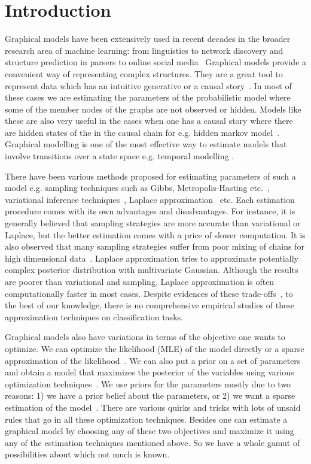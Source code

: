 \section{Introduction}

Graphical models have been extensively used in recent decades in the broader
research area of machine learning: from linguistics to network discovery and
structure prediction in parsers to online social
media~\cite{Koller+Friedman:09} Graphical models provide a convenient way of
representing complex structures.  They are a great tool to represent data
which has an intuitive generative or a causal story~\cite{GettingStarted}. In
most of these cases we are estimating the parameters of the probabilistic
model where some of the member nodes of the graphs are not observed or hidden.
Models like these are also very useful in the cases when one has a causal
story where there are hidden states of the in the causal chain for e.g. hidden
markov model~\cite{Baum1967}. Graphical modelling is one of the most effective
way to estimate models that involve transitions over a state space e.g.
temporal modelling \cite{Arnold:2007:TCM:1281192.1281203}. 

There have been various methods proposed for estimating parameters of such a
model e.g. sampling techniques such as Gibbs, Metropolis-Hasting
etc.~\cite{Robert:2005:MCS:1051451}, variational inference
techniques~\cite{citeulike:6420690}, Laplace
approximation~\cite{Azevedo-Filho:1994} etc. Each estimation procedure comes
with its own advantages and disadvantages. For instance, it is generally
believed that sampling strategies are more accurate than variational or
Laplace, but the better estimation comes with a price of slower computation.
It is also observed that many sampling strategies suffer from poor mixing of
chains for high dimensional data~\cite{ShenACOSB10}. Laplace approximation
tries to approximate potentially complex posterior distribution with
multivariate Gaussian. Although the results are poorer than variational and
sampling, Laplace approximation is often computationally faster in most cases.
Despite evidences of these trade-offs~\cite{Asuncion2009smoothing,
medlda_MCMC12}, to the best of our knowledge, there is no comprehensive
empirical studies of these approximation techniques on classification tasks. 

Graphical models also have variations in terms of the objective one wants to
optimize. We can optimize the likelihood (MLE) of the model directly or a
sparse approximation of the likelihood~\cite{Banerjee:2008}. We can also put a
prior on a set of parameters and obtain a model that maximizes the posterior
of the variables using various optimization techniques~\cite{abs-0710-0013}.
We use priors for the parameters mostly due to two reasons: 1) we have a prior
belief about the parameters, or 2) we want a sparse estimation of the
model~\cite{Yoshida:2010}. There are various quirks and tricks with lots of
unsaid rules that go in all these optimization techniques. Besides one can
estimate a graphical model by choosing any of these two objectives and
maximize it using any of the estimation techniques mentioned above. So we have
a whole gamut of possibilities about which not much is known. 

